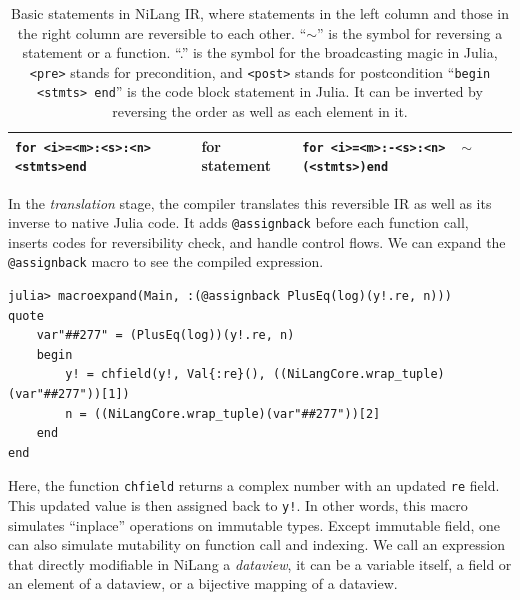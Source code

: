 \documentclass{article}
\newcommand{\<}{\langle}
\renewcommand{\>}{\rangle}
\newcommand{\cquad}{{{ }_{\quad}}}
\theoremstyle{definition}\newtheorem{definition}{\textit{Definition}}
\begin{document}
\begin{table}[h!]
\begin{minipage}{\columnwidth}
{\begin{tabularx}{\textwidth}{X X X}
            \hline
            \texttt{for <i>=<m>:<s>:<n>}\newline $\cquad$\texttt{<stmts>}\newline \texttt{end} & for statement & \texttt{for <i>=<m>:-<s>:<n>}\newline $\cquad$ \texttt{$\sim$(<stmts>)}\newline \texttt{end}\\
            \bottomrule
        \end{tabularx}
    }
    \caption{Basic statements in NiLang IR, where statements in the left column and those in the right column are reversible to each other.
    ``$\sim$'' is the symbol for reversing a statement or a function.
    ``.'' is the symbol for the broadcasting magic in Julia,
    \texttt{<pre>} stands for precondition, and \texttt{<post>} stands for postcondition
``\texttt{begin <stmts> end}'' is the code block statement in Julia.
It can be inverted by reversing the order as well as each element in it.
}\label{tbl:revstatements}
\end{minipage}
\end{table}

In the \textit{translation} stage, the compiler translates this reversible IR as well as its inverse to native Julia code. It adds \texttt{@assignback} before each function call, inserts codes for reversibility check, and handle control flows.
We can expand the \texttt{@assignback} macro to see the compiled expression.

\begin{minipage}{.88\columnwidth}
\begin{lstlisting}
julia> macroexpand(Main, :(@assignback PlusEq(log)(y!.re, n)))
quote
    var"##277" = (PlusEq(log))(y!.re, n)
    begin
        y! = chfield(y!, Val{:re}(), ((NiLangCore.wrap_tuple)(var"##277"))[1])
        n = ((NiLangCore.wrap_tuple)(var"##277"))[2]
    end
end
\end{lstlisting}
\end{minipage}

Here, the function \texttt{chfield} returns a complex number with an updated \texttt{re} field. This updated value is then assigned back to \texttt{y!}.
In other words, this macro simulates ``inplace'' operations on immutable types.
Except immutable field, one can also simulate mutability on function call and indexing. We call an expression that directly modifiable in NiLang a \textit{dataview}, it can be a variable itself, a field or an element of a dataview, or a bijective mapping of a dataview.
\end{document}
